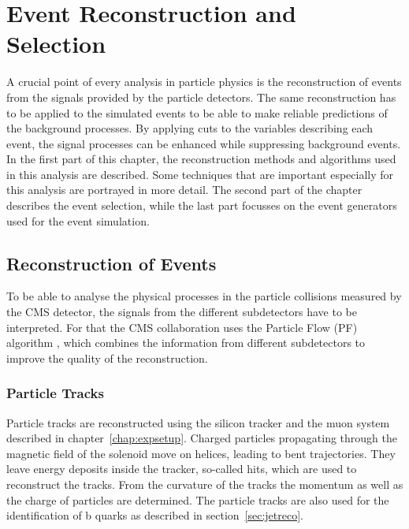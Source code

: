 \chapter{Event Reconstruction and Selection}
\label{chap::EventReconstructionandSelection}
A crucial point of every analysis in particle physics is the reconstruction of events from the signals provided by the particle detectors. The same reconstruction has to be applied to the simulated events to be able to make reliable predictions of the background processes. By applying cuts to the variables describing each event, the signal processes can be enhanced while suppressing background events.\\

\noindent In the first part of this chapter, the reconstruction methods and algorithms used in this analysis are described. Some techniques that are important especially for this analysis are portrayed in more detail. The second part of the chapter describes the event selection, while the last part focusses on the event generators used for the event simulation.
\section{Reconstruction of Events}
To be able to analyse the physical processes in the particle collisions measured by the CMS detector, the signals from the different subdetectors have to be interpreted. For that the CMS collaboration uses the Particle Flow (PF) algorithm \cite{PF1,PF2}, which combines the information from different subdetectors to improve the quality of the reconstruction.
\subsection{Particle Tracks}
Particle tracks are reconstructed using the silicon tracker and the muon system described in chapter~\ref{chap:expsetup}. Charged particles propagating through the magnetic field of the solenoid move on helices, leading to bent trajectories. They leave energy deposits inside the tracker, so-called hits, which are used to reconstruct the tracks. From the curvature of the tracks the momentum as well as the charge of particles are determined. The particle tracks are also used for the identification of b quarks as described in section~\ref{sec:jetreco}.\\

